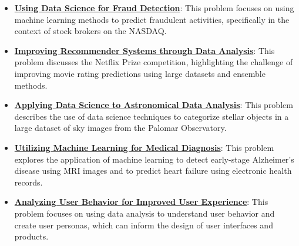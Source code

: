 \documentclass{article}%
\begin{document}
\begin{itemize}[leftmargin=*]
\item \href{https://purdue.brightspace.com/d2l/common/assets/pdfjs-d2l-dist/1.0.14-legacy/web/viewer.html?file=\%2Fcontent\%2Fenforced\%2F1095465-WL.202510.CS24200.LE1\%2F02L1-datas-intro.pdf\%3Fou\%3D1095465\&lang=en-us\&container=d2l-fileviewer-rendered-pdf\&fullscreen=d2l-fileviewer-rendered-pdf-dialog\&height=667#page=13}{\textbf{Using Data Science for Fraud Detection}}: This problem focuses on using machine learning methods to predict fraudulent activities, specifically in the context of stock brokers on the NASDAQ.%
\item \href{https://purdue.brightspace.com/d2l/common/assets/pdfjs-d2l-dist/1.0.14-legacy/web/viewer.html?file=\%2Fcontent\%2Fenforced\%2F1095465-WL.202510.CS24200.LE1\%2F02L1-datas-intro.pdf\%3Fou\%3D1095465\&lang=en-us\&container=d2l-fileviewer-rendered-pdf\&fullscreen=d2l-fileviewer-rendered-pdf-dialog\&height=667#page=14}{\textbf{Improving Recommender Systems through Data Analysis}}: This problem discusses the Netflix Prize competition, highlighting the challenge of improving movie rating predictions using large datasets and ensemble methods.%
\item \href{https://purdue.brightspace.com/d2l/common/assets/pdfjs-d2l-dist/1.0.14-legacy/web/viewer.html?file=\%2Fcontent\%2Fenforced\%2F1095465-WL.202510.CS24200.LE1\%2F02L1-datas-intro.pdf\%3Fou\%3D1095465\&lang=en-us\&container=d2l-fileviewer-rendered-pdf\&fullscreen=d2l-fileviewer-rendered-pdf-dialog\&height=667#page=15}{\textbf{Applying Data Science to Astronomical Data Analysis}}: This problem describes the use of data science techniques to categorize stellar objects in a large dataset of sky images from the Palomar Observatory.%
\item \href{https://purdue.brightspace.com/d2l/common/assets/pdfjs-d2l-dist/1.0.14-legacy/web/viewer.html?file=\%2Fcontent\%2Fenforced\%2F1095465-WL.202510.CS24200.LE1\%2F02L1-datas-intro.pdf\%3Fou\%3D1095465\&lang=en-us\&container=d2l-fileviewer-rendered-pdf\&fullscreen=d2l-fileviewer-rendered-pdf-dialog\&height=667#page=16}{\textbf{Utilizing Machine Learning for Medical Diagnosis}}: This problem explores the application of machine learning to detect early-stage Alzheimer's disease using MRI images and to predict heart failure using electronic health records.%
\item \href{https://purdue.brightspace.com/d2l/common/assets/pdfjs-d2l-dist/1.0.14-legacy/web/viewer.html?file=\%2Fcontent\%2Fenforced\%2F1095465-WL.202510.CS24200.LE1\%2F02L1-datas-intro.pdf\%3Fou\%3D1095465\&lang=en-us\&container=d2l-fileviewer-rendered-pdf\&fullscreen=d2l-fileviewer-rendered-pdf-dialog\&height=667#page=18}{\textbf{Analyzing User Behavior for Improved User Experience}}: This problem focuses on using data analysis to understand user behavior and create user personas, which can inform the design of user interfaces and products.%

\end{itemize}
\end{document}
